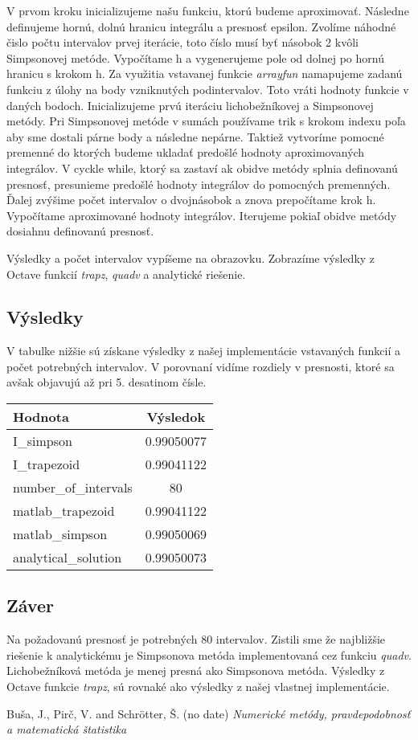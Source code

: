 \documentclass{article}
\theoremstyle{definition}
\theoremstyle{remark}
\begin{document}
V prvom kroku inicializujeme našu funkciu, ktorú budeme aproximovať. Následne definujeme hornú, dolnú hranicu integrálu a presnosť epsilon. Zvolíme náhodné čislo počtu intervalov prvej iterácie, toto číslo musí byť násobok 2 kvôli Simpsonovej metóde. Vypočítame h a vygenerujeme pole od dolnej po hornú hranicu s krokom h. Za využitia vstavanej funkcie \emph{arrayfun} namapujeme zadanú funkciu z úlohy na body vzniknutých podintervalov. Toto vráti hodnoty funkcie v daných bodoch. Inicializujeme prvú iteráciu lichobežníkovej a Simpsonovej metódy. Pri Simpsonovej metóde v sumách používame trik s krokom indexu poľa aby sme dostali párne body a následne nepárne. Taktiež vytvoríme pomocné premenné do ktorých budeme ukladať predošlé hodnoty aproximovaných integrálov. V cyckle while, ktorý sa zastaví ak obidve metódy splnia definovanú presnosť, presunieme predošlé hodnoty integrálov do pomocných premenných. Ďalej zvýšime počet intervalov o dvojnásobok a znova prepočítame krok h. Vypočítame aproximované hodnoty integrálov. Iterujeme pokiaľ obidve metódy dosiahnu definovanú presnosť.

Výsledky a počet intervalov vypíšeme na obrazovku.
Zobrazíme výsledky z Octave funkcií \emph{trapz}, \emph{quadv} a analytické riešenie. 


\subsection{Výsledky}
V tabulke nižšie sú získane výsledky z našej implementácie vstavaných funkcií a počet potrebných intervalov. V porovnaní vidíme rozdiely v presnosti, ktoré sa avšak objavujú až pri 5. desatinom čísle.


\begin{tabular}{|l|S[round-precision=6]|}
  
  \hline
  \textbf{Hodnota} & \textbf{Výsledok} \\
  \hline
  I\_simpson & 0.99050077 \\
  I\_trapezoid & 0.99041122 \\
  number\_of\_intervals & 80 \\
  matlab\_trapezoid & 0.99041122 \\
  matlab\_simpson & 0.99050069 \\
  analytical\_solution & 0.99050073 \\
  \hline
\end{tabular}
\subsection{Záver}
Na požadovanú presnosť je potrebných 80 intervalov. Zistili sme že najbližšie riešenie k analytickému je Simpsonova metóda implementovaná cez funkciu \emph{quadv}. Lichobežníková metóda je menej presná ako Simpsonova metóda. Výsledky z Octave funkcie \emph{trapz},  sú rovnaké ako výsledky z našej vlastnej implementácie.

\begin{thebibliography}{99}
 Buša, J., Pirč, V. and Schrötter, Š. (no date) \emph{Numerické metódy, pravdepodobnosť a matematická štatistika}
\end{thebibliography}
\end{document}
